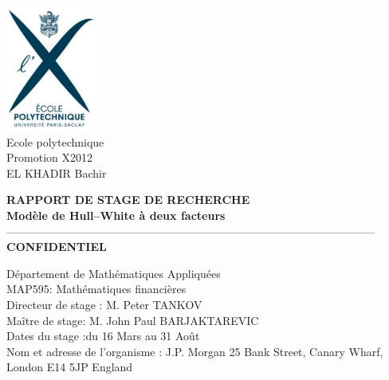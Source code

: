 
\includegraphics[width=3cm]{img/EP.jpg}\\
Ecole polytechnique\\
Promotion X2012 \\
EL KHADIR Bachir \\
\vspace{5cm}
\begin{center}
\huge{\textbf{RAPPORT DE STAGE DE RECHERCHE}}\\
\textbf{Modèle de Hull–White à deux facteurs}\\
---------------------------------------------------------------------------------------------------
\huge{\textbf{CONFIDENTIEL}}\\
\end{center}
\vspace{3cm}
Département de Mathématiques Appliquées \\
MAP595: Mathématiques financières	\\
Directeur de stage : M. Peter TANKOV \\
Maître de stage: M. John Paul BARJAKTAREVIC\\
Dates du stage :du 16 Mars au 31 Août \\
Nom et adresse de l'organisme : 
J.P. Morgan
25 Bank Street,
Canary Wharf,
London E14 5JP
England

\clearpage


